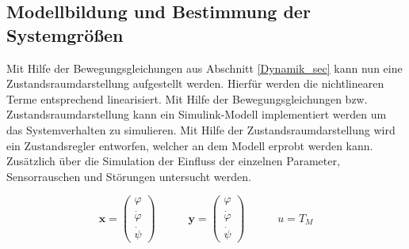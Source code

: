 \subsection{Modellbildung und Bestimmung der Systemgrößen}
Mit Hilfe der Bewegungsgleichungen aus Abschnitt \ref{Dynamik_sec} kann nun eine Zustandsraumdarstellung aufgestellt werden. Hierfür werden die nichtlinearen Terme entsprechend linearisiert. Mit Hilfe der Bewegungsgleichungen bzw. Zustandsraumdarstellung kann ein Simulink-Modell implementiert werden um das Systemverhalten zu simulieren. Mit Hilfe der Zustandsraumdarstellung wird ein Zustandsregler entworfen, welcher an dem Modell erprobt werden kann. Zusätzlich über die Simulation der Einfluss der einzelnen Parameter, Sensorrauschen und Störungen untersucht werden.

\begin{equation}
\textbf{x} = \begin{pmatrix}
\varphi \\ \dot{\varphi} \\ \dot{\psi}
\end{pmatrix}
\hspace{35pt}
\textbf{y} = \begin{pmatrix}
\varphi \\ \dot{\varphi} \\ \dot{\psi}
\end{pmatrix}
\hspace{35pt}
u = T_M
\end{equation}

